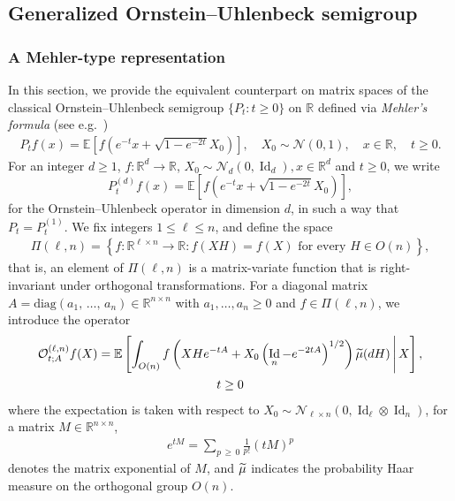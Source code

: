 \documentclass[10pt]{amsart}
\theoremstyle{definition}\newtheorem{defi}[theo]{Definition}\newtheorem{rema}[theo]{Remark}\newtheorem{exam}[theo]{Example}\newtheorem{exem}[theo]{Example}\newtheorem{nota}[theo]{Notation}
\DeclareMathOperator{\Id}{Id}
\newcommand{\scN}{\mathscr{N}}
\newcommand{\diag}{\mathrm{diag}}
\newcommand{\clO}{\mathcal{O}}
\newcommand{\R}{\mathbb{R}}
\newcommand{\E}[1]{\mathbb{E}\left[#1\right]}
\let\oldtilde\tilde
\renewcommand*{\tilde}[1]{\mathchoice{\widetilde{#1}}{\widetilde{#1}}{\oldtilde{#1}}{\oldtilde{#1}}}
\begin{document}
\subsection{Generalized Ornstein--Uhlenbeck semigroup}\label{SecOrtho}
\subsubsection{A Mehler-type representation}
In this section, we provide the equivalent counterpart on matrix spaces of the classical Ornstein--Uhlenbeck semigroup $\{P_t:t\geq 0\}$ on $\R$ defined via \emph{Mehler's formula} (see e.g.~\cite[Theorem~2.8.2]{NP12})
\begin{gather*}\label{Mehler}
P_tf(x) = \E{f\left(e^{-t}x+\sqrt{1-e^{-2t}}X_0\right)}, \quad X_0 \sim \scN(0,1), \quad x \in \R,\quad t\geq0.
\end{gather*}
For an integer $d\geq 1$, $f:\R^d \to \R$, $ X_0 \sim \scN_d(0, \Id_d), x \in \R^d$ and $ t\geq 0$, we write
\begin{equation}\label{Eq:Ptd}
P_t^{(d)} f(x) = \E{f\left(e^{-t}x+\sqrt{1-e^{-2t}}X_0\right)},
\end{equation}
for the Ornstein--Uhlenbeck operator in dimension $d$, in such a way that $P_t=P_t^{(1)}$. We fix integers $1\leq \ell\leq n$, and define the space
\begin{gather}\label{Piln}
\Pi(\ell,n)= \left\{ f: \R^{\ell \times n}\to \R: f(XH)=f(X) \textrm{ for every } H \in O(n)\right\},
\end{gather}
that is, an element of $\Pi(\ell,n)$ is a matrix-variate function that is right-invariant under orthogonal transformations. For a diagonal matrix $A=\diag(a_1,\,\ldots,\,a_n)\in \R^{n\times n}$ with $a_1,\ldots,a_n \geq 0$ and $f\in\Pi(\ell,n)$, we introduce the operator
\begin{multline}\label{OU}
\clO_{t;A}^{(\ell,n)}f(X) = \E{ \int_{O(n)} f\left(XHe^{-tA}+X_0\left(\Id_n-e^{-2tA}\right)^{1/2}\right) \tilde{\mu}(dH)\,\middle|\,X}, \\ t\geq0
\end{multline}
where the expectation is taken with respect to $X_0 \sim \scN_{\ell\times n}(0,\Id_{\ell}\otimes \Id_n)$, for a matrix $M \in \R^{n\times n}$,
\begin{gather*}
e^{tM} = \sum_{p\,\geq\,0} \frac{1}{p!}(tM)^p
\end{gather*}
denotes the matrix exponential of $M$, and $\tilde{\mu}$ indicates the probability Haar measure on the orthogonal group $O(n)$.
\end{document}
